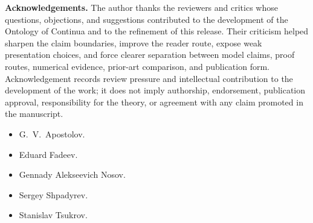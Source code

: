 \clearpage
\noindent\textbf{Acknowledgements.}
The author thanks the reviewers and critics whose questions, objections, and
suggestions contributed to the development of the Ontology of Continua and to
the refinement of this release. Their criticism helped sharpen the claim
boundaries, improve the reader route, expose weak presentation choices, and
force clearer separation between model claims, proof routes, numerical evidence,
prior-art comparison, and publication form. Acknowledgement records review
pressure and intellectual contribution to the development of the work; it does
not imply authorship, endorsement, publication approval, responsibility for the
theory, or agreement with any claim promoted in the manuscript.
\begin{itemize}
    \item G.~V.~Apostolov.
    \item Eduard Fadeev.
    \item Gennady Alekseevich Nosov.
    \item Sergey Shpadyrev.
    \item Stanislav Tsukrov.
\end{itemize}

